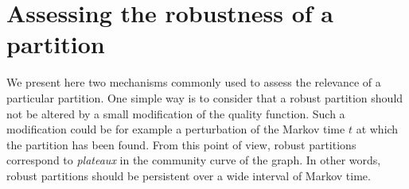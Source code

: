 \section{Assessing the robustness of a partition} \label{subsec:robustness}
We present here two mechanisms commonly used to assess the relevance of a particular partition. One simple way is to consider that a robust partition should not be altered by a small modification of the quality function. Such a modification could be for example a perturbation of the Markov time $t$ at which the partition has been found. From this point of view, robust partitions correspond to \textit{plateaux} in the community curve of the graph. In other words, robust partitions should be persistent over a wide interval of Markov time.

